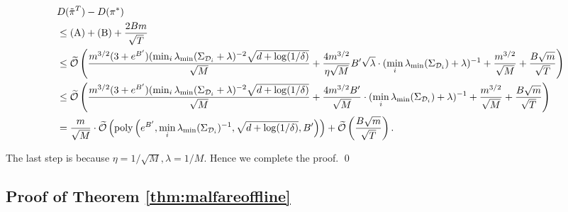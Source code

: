 \begin{small}
\begin{align*}
    &D(\tilde{\pi}^T)-D(\pi^*) \\&\le \text{(A)} + \text{(B)} + \frac{2Bm}{\sqrt{T}}\\
    &\le \widetilde{\mathcal{O}}\left(\frac{m^{3/2}(3+e^{B'}) (\min_i\lambda_{\min}(\Sigma_{\mathcal{D}_i} + \lambda)^{-2}\sqrt{d+\log(1/\delta)}}{\sqrt{M}} + \frac{4m^{3/2}}{\eta\sqrt{M}}B'\sqrt{\lambda}\cdot (\min_i\lambda_{\min}(\Sigma_{\mathcal{D}_i}) + \lambda)^{-1} + \frac{m^{3/2}}{\sqrt{M}}+\frac{B\sqrt{m}}{\sqrt{T}}\right)\\
    &\le \widetilde{\mathcal{O}}\left(\frac{m^{3/2}(3+e^{B'}) (\min_i\lambda_{\min}(\Sigma_{\mathcal{D}_i} + \lambda)^{-2}\sqrt{d+\log(1/\delta)}}{\sqrt{M}} + \frac{4m^{3/2}B'}{\sqrt{M}}\cdot (\min_i \lambda_{\min}(\Sigma_{\mathcal{D}_i}) + \lambda)^{-1} + \frac{m^{3/2}}{\sqrt{M}} + \frac{B\sqrt{m}}{\sqrt{T}}\right)\\
    & = \frac{m}{\sqrt{M}}\cdot \widetilde{\mathcal{O}}\left(\text{poly}\left(e^{B'}, \min_i\lambda_{\min}(\Sigma_{\mathcal{D}_i})^{-1}, \sqrt{d+\log(1/\delta)},B'\right)\right)+ \widetilde{\mathcal{O}}\left(\frac{B\sqrt{m}}{\sqrt{T}}\right).
\end{align*}
\end{small}
The last step is because $\eta = 1/\sqrt{M}, \lambda = 1/M$. Hence we complete the proof. \qed
\subsection{Proof of Theorem \ref{thm:malfareoffline}}\label{sec: malfare_proof_offline}

